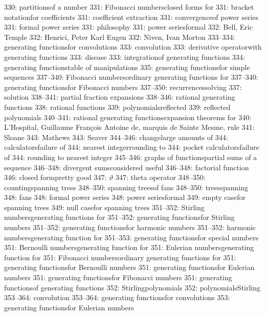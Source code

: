 330: partitions\sub of a number
331: Fibonacci numbers\sub closed forms for
331: bracket notation\sub for coefficients
331: coefficient extraction
331: convergence\sub of power series
331: formal power series
331: philosophy
331: power series\sub formal
332: Bell, Eric Temple
332: Henrici, Peter Karl Eugen
332: Niven, Ivan Morton
333--334: generating functions\sub for convolutions
333: convolution
333: derivative operator\sub with generating functions
333: disease
333: integration\sub of generating functions
334: generating functions\sub table of manipulations
335: generating functions\sub for simple sequences
337--340: Fibonacci numbers\sub ordinary generating functions for
337--340: generating functions\sub for Fibonacci numbers
337--350: recurrences\sub solving
337: solution
338--341: partial fraction expansions
338--346: rational generating functions
338: rational functions
339: polynomials\sub reflected
339: reflected polynomials
340--341: rational generating functions\sub expansion theorems for
340: L'Hospital, Guillaume Fran\c{c}ois Antoine de, marquis de Sainte Mesme, rule
341: Sloane
343: Mathews
343: Seaver
344--346: change\sub large amounts of
344: calculators\sub failure of
344: nearest integer\sub rounding to
344: pocket calculators\sub failure of
344: rounding to nearest integer
345--346: graphs of functions\sub partial sums of a sequence
346--348: divergent sums\sub considered useful
346--348: factorial function
346: closed form\sub pretty good
347: $\vartheta$
347: theta operator
348--350: counting\sub spanning trees
348--350: spanning trees\sub of fans
348--350: trees\sub spanning
348: fans
348: formal power series
348: power series\sub formal
349: empty case\sub for spanning trees
349: null case\sub for spanning trees
351--352: Stirling numbers\sub generating functions for
351--352: generating functions\sub for Stirling numbers
351--352: generating functions\sub for harmonic numbers
351--352: harmonic numbers\sub generating function for
351--353: generating functions\sub for special numbers
351: Bernoulli numbers\sub generating function for
351: Eulerian numbers\sub generating function for
351: Fibonacci numbers\sub ordinary generating functions for
351: generating functions\sub for Bernoulli numbers
351: generating functions\sub for Eulerian numbers
351: generating functions\sub for Fibonacci numbers
351: generating functions\sub of generating functions
352: Stirling\sub polynomials
352: polynomials\sub Stirling
353--364: convolution
353--364: generating functions\sub for convolutions
353: generating functions\sub for Eulerian numbers
